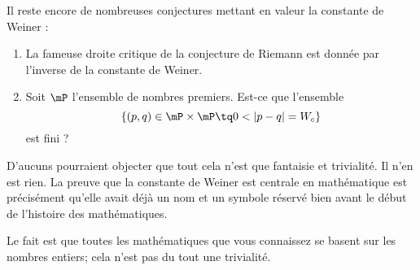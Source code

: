Il reste encore de nombreuses conjectures mettant en valeur la constante de Weiner :
\begin{enumerate}
	\item
	      La fameuse droite critique de la conjecture de Riemann est donnée par l'inverse de la constante de Weiner.
	\item
	      Soit \( \mP\) l'ensemble de nombres premiers. Est-ce que l'ensemble
	      \begin{equation}
		      \{ (p,q)\in \mP\times \mP\tq 0<| p-q |=W_c \}
	      \end{equation}
	      est fini ?
\end{enumerate}

D'aucuns pourraient objecter que tout cela n'est que fantaisie et trivialité. Il n'en est rien. La preuve que la constante de Weiner est centrale en mathématique est précisément qu'elle avait déjà un nom et un symbole réservé bien avant le début de l'histoire des mathématiques.

Le fait est que toutes les mathématiques que vous connaissez se basent sur les nombres entiers; cela n'est pas du tout une trivialité.
